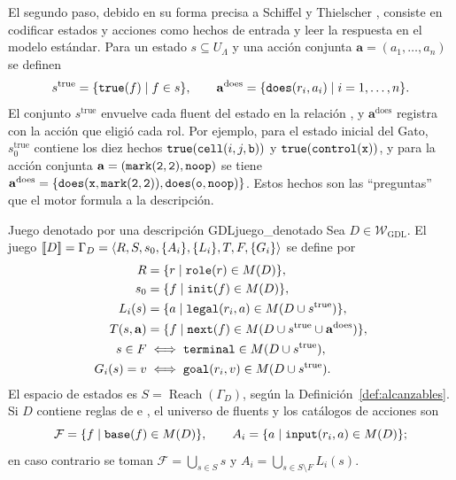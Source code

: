 El segundo paso, debido en su forma precisa a Schiffel y Thielscher \cite{SchiffelThielscher2010Semantics}, consiste en codificar estados y acciones como hechos de entrada y leer la respuesta en el modelo estándar. Para un estado $s \subseteq U_\Lambda$ y una acción conjunta $\mathbf a = (a_1, \dots, a_n)$ se definen
\begin{equation}
    s^{\mathrm{true}} = \{\texttt{true}(f) \mid f \in s\},
    \qquad
    \mathbf a^{\mathrm{does}} = \{\texttt{does}(r_i, a_i) \mid i = 1, \dots, n\}.
    \label{eq:an_codificacion}
\end{equation}
El conjunto $s^{\mathrm{true}}$ envuelve cada fluent del estado en la relación , y $\mathbf a^{\mathrm{does}}$ registra con  la acción que eligió cada rol. Por ejemplo, para el estado inicial del Gato, $s_0^{\mathrm{true}}$ contiene los diez hechos $\texttt{true}(\texttt{cell}(i, j, \texttt{b}))$ y $\texttt{true}(\texttt{control}(\texttt{x}))$, y para la acción conjunta $\mathbf a = (\texttt{mark}(\texttt{2}, \texttt{2}), \texttt{noop})$ se tiene $\mathbf a^{\mathrm{does}} = \{\texttt{does}(\texttt{x}, \texttt{mark}(\texttt{2}, \texttt{2})), \texttt{does}(\texttt{o}, \texttt{noop})\}$. Estos hechos son las ``preguntas'' que el motor formula a la descripción.

\begin{definicion}{Juego denotado por una descripción GDL}{juego_denotado}
Sea $D \in \mathcal W_{\mathrm{GDL}}$. El juego $[\![D]\!] = \Gamma_D = \langle R, S, s_0, \{A_i\}, \{L_i\}, T, F, \{G_i\} \rangle$ se define por
\begin{align}
    R &= \{ r \mid \texttt{role}(r) \in M(D) \}, \label{eq:an_sem_R}\\
    s_0 &= \{ f \mid \texttt{init}(f) \in M(D) \}, \label{eq:an_sem_s0}\\
    L_i(s) &= \{ a \mid \texttt{legal}(r_i, a) \in M(D \cup s^{\mathrm{true}}) \}, \label{eq:an_sem_L}\\
    T(s, \mathbf a) &= \{ f \mid \texttt{next}(f) \in M(D \cup s^{\mathrm{true}} \cup \mathbf a^{\mathrm{does}}) \}, \label{eq:an_sem_T}\\
    s \in F &\iff \texttt{terminal} \in M(D \cup s^{\mathrm{true}}), \label{eq:an_sem_F}\\
    G_i(s) = v &\iff \texttt{goal}(r_i, v) \in M(D \cup s^{\mathrm{true}}). \label{eq:an_sem_G}
\end{align}
El espacio de estados es $S = \operatorname{Reach}(\Gamma_D)$, según la Definición~\ref{def:alcanzables}. Si $D$ contiene reglas de  e , el universo de fluents y los catálogos de acciones son
\begin{equation}
    \mathcal F = \{ f \mid \texttt{base}(f) \in M(D) \},
    \qquad
    A_i = \{ a \mid \texttt{input}(r_i, a) \in M(D) \};
    \label{eq:an_sem_dom}
\end{equation}
en caso contrario se toman $\mathcal F = \bigcup_{s \in S} s$ y $A_i = \bigcup_{s \in S \setminus F} L_i(s)$.
\end{definicion}

